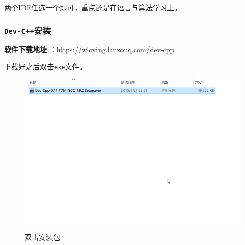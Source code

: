 两个IDE任选一个即可，重点还是在语言与算法学习上。

\subsubsection{\texttt{Dev-C++}安装}
\textbf{软件下载地址} ：\href{https://wloving.lanzouq.com/dev-cpp}{https://wloving.lanzouq.com/dev-cpp}

下载好之后双击\texttt{exe}文件。
\begin{figure}[H]
\centering
\includegraphics[width=0.6\linewidth]{01chapter/img/dev安装01}
\caption{双击安装包}
\label{fig:dev01}
\end{figure}

